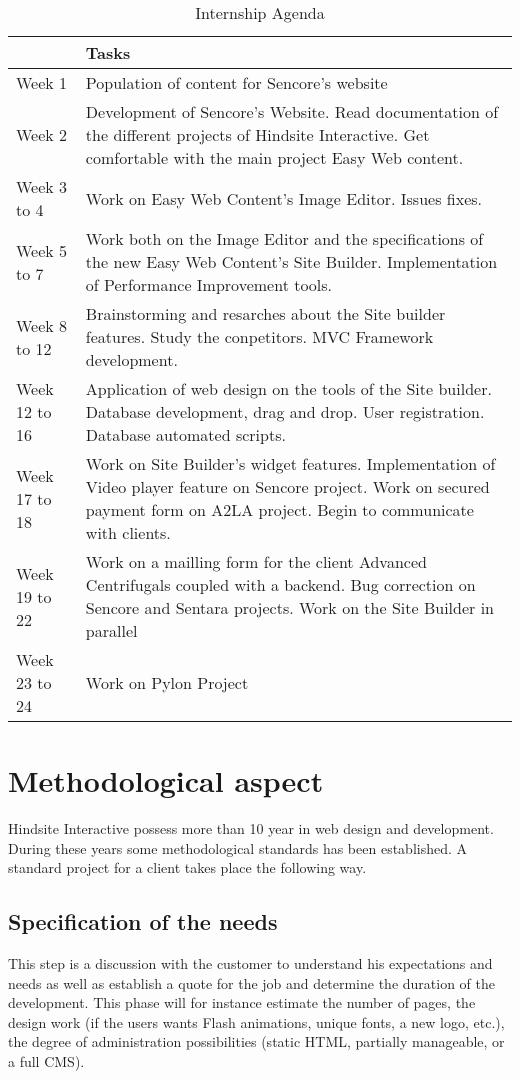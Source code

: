 \begin{table}[!h]
	\caption{\label{tableau:agenda}Internship Agenda}
	\begin{tabular}{ | l | p{12cm} | }
		\hline
		 & Tasks\\
		\hline
		Week 1	&	Population of content for Sencore's website\\	\hline
		Week 2	&	Development of Sencore's Website. Read documentation of the different projects of Hindsite Interactive. Get comfortable with the main project Easy Web content.\\	\hline
		Week 3 to 4	&	Work on Easy Web Content's Image Editor. Issues fixes.\\	\hline
		Week 5 to 7	&	Work both on the Image Editor and the specifications of the new Easy Web Content's Site Builder. Implementation of Performance Improvement tools.\\	\hline
		Week 8 to 12	&	Brainstorming and resarches about the Site builder features. Study the conpetitors. MVC Framework development.\\	\hline
		Week 12 to 16	&	Application of web design on the tools of the Site builder. Database development, drag and drop. User registration. Database automated scripts.	\\	\hline
		Week 17	to 18&	Work on Site Builder's widget features. Implementation of Video player feature on Sencore project. Work on secured payment form on A2LA project. Begin to communicate with clients.\\	\hline
		Week 19	to 22 &	Work on a mailling form for the client Advanced Centrifugals coupled with a backend. Bug correction on Sencore and Sentara projects. Work on the Site Builder in parallel\\	\hline
		Week 23	to 24&	Work on Pylon Project\\	\hline
	\end{tabular}
\end{table}

\section{Methodological aspect}

Hindsite Interactive possess more than 10 year in web design and development. During these years 
some methodological standards has been established. A standard project for a client takes place the following way.

\subsection*{Specification of the needs}
This step is a discussion with the customer to understand his expectations
and needs as well as establish a quote for the job and determine the duration
of the development.
This phase will for instance estimate the number of pages, the design work (if
the users wants Flash animations, unique fonts, a new logo, etc.), the degree
of administration possibilities (static HTML, partially manageable, or a full
CMS).

